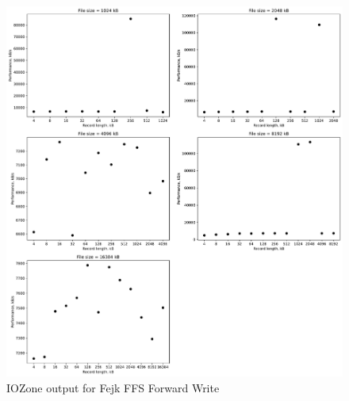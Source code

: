 \begin{figure}[!htb]
	\label{fig:app_benchf_ffs_write}
	\begin{center}
		\includegraphics[width=1.0\textwidth]{figures/benchmarking/fake-ffs/Write.pdf}
	\end{center}
	\caption{IOZone output for Fejk \gls{FFS} Forward Write}
\end{figure}

